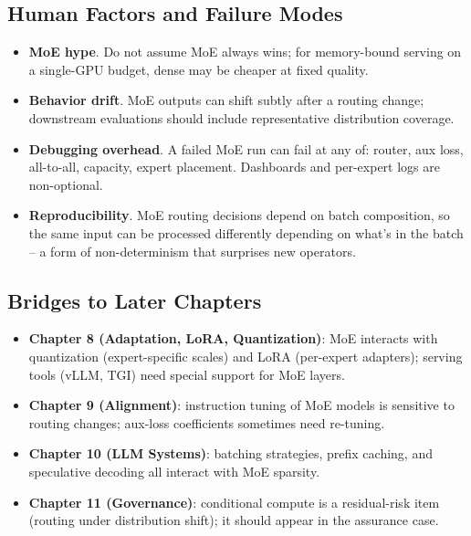 \subsection{Human Factors and Failure Modes}

\begin{itemize}
  \item \textbf{MoE hype}. Do not assume MoE always wins; for
        memory-bound serving on a single-GPU budget, dense may be
        cheaper at fixed quality.
  \item \textbf{Behavior drift}. MoE outputs can shift subtly after
        a routing change; downstream evaluations should include
        representative distribution coverage.
  \item \textbf{Debugging overhead}. A failed MoE run can fail at any
        of: router, aux loss, all-to-all, capacity, expert placement.
        Dashboards and per-expert logs are non-optional.
  \item \textbf{Reproducibility}. MoE routing decisions depend on
        batch composition, so the same input can be processed
        differently depending on what's in the batch -- a form of
        non-determinism that surprises new operators.
\end{itemize}

\subsection{Bridges to Later Chapters}

\begin{itemize}
  \item \textbf{Chapter 8 (Adaptation, LoRA, Quantization)}: MoE
        interacts with quantization (expert-specific scales) and
        LoRA (per-expert adapters); serving tools (vLLM, TGI) need
        special support for MoE layers.
  \item \textbf{Chapter 9 (Alignment)}: instruction tuning of MoE models
        is sensitive to routing changes; aux-loss coefficients
        sometimes need re-tuning.
  \item \textbf{Chapter 10 (LLM Systems)}: batching strategies, prefix
        caching, and speculative decoding all interact with MoE
        sparsity.
  \item \textbf{Chapter 11 (Governance)}: conditional compute is a
        residual-risk item (routing under distribution shift); it
        should appear in the assurance case.
\end{itemize}

